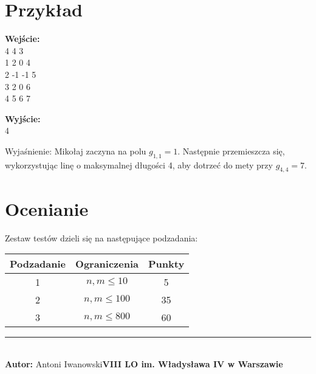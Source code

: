 \documentclass[a4paper,11pt]{article}
\newcommand{\exampleinput}{\\4 4 3
\\1 2 0 4
\\2 -1 -1 5
\\3 2 0 6
\\4 5 6 7}
\newcommand{\exampleoutput}{\\4}
\newcommand{\explanation}{Mikołaj zaczyna na polu \( g_{1,1} = 1 \). Następnie przemieszcza się, wykorzystując linę o maksymalnej długości 4, aby dotrzeć do mety przy \( g_{4,4} = 7 \).}
\newcommand{\authorinfo}{Antoni Iwanowski}
\newcommand{\schoolinfo}{VIII LO im. Władysława IV w Warszawie}
\newcommand{\subtasktable}{%
\begin{tabular}{|c|c|c|}
\hline
Podzadanie & Ograniczenia & Punkty \\
\hline
1 & $n, m \leq 10$ & 5 \\
2 & $n, m \leq 100$ & 35 \\
3 & $n, m \leq 800$ & 60 \\
\hline
\end{tabular}}
\begin{document}
\section*{Przykład}
\vspace{-0.5cm}
\begin{multicols}{2}
\noindent\textbf{Wejście:}
\exampleinput

\columnbreak

\noindent\textbf{Wyjście:}
\exampleoutput
\end{multicols}

\noindent Wyjaśnienie: \explanation

\section*{Ocenianie}
Zestaw testów dzieli się na następujące podzadania:
\begin{center}
\subtasktable
\end{center}

\vspace*{\fill}
\noindent \rule{\textwidth}{0.4pt} \\
\textbf{Autor:} \authorinfo  \hfill \textbf{\schoolinfo} \\
\end{document}
